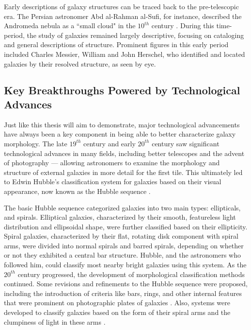 Early descriptions of galaxy structures can be traced back to the pre-telescopic era. The Persian astronomer Abd al-Rahman al-Sufi, for instance, described the Andromeda nebula as a ``small cloud" in the $10^{th}$ century \citep{kepple_98}. During this time-period, the study of galaxies remained largely descriptive, focusing on cataloging and general descriptions of structure. Prominent figures in this early period included Charles Messier, William and John Herschel, who identified and located galaxies by their resolved structure, as seen by eye.

\subsection{Key Breakthroughs Powered by Technological Advances} \label{sec_intro:technology}

Just like this thesis will aim to demonstrate, major technological advancements have always been a key component in being able to better characterize galaxy morphology. The late $19^{th}$ century and early $20^{th}$ century saw significant technological advances in many fields, including better telescopes and the advent of photography ---  allowing astronomers to examine the morphology and structure of external galaxies in more detail for the first tile\citep[e.g.,][]{wolf_08,lundmark_26}. This ultimately led to Edwin Hubble's classification system for galaxies based on their visual appearance, now known as the Hubble sequence \citep{hubble_1926}. 

The basic Hubble sequence categorized galaxies into two main types: ellipticals, and spirals.  Elliptical galaxies, characterized by their smooth, featureless light distribution and ellipsoidal shape, were further classified based on their ellipticity. Spiral galaxies, characterized by their flat, rotating disk component with spiral arms, were divided into normal spirals and barred spirals, depending on whether or not they exhibited a central bar structure. Hubble, and the astronomers who followed him, could classify most nearby bright galaxies using this system. As the $20^{th}$ century progressed, the development of morphological classification methods continued. Some revisions and refinements to the Hubble sequence were proposed, including the introduction of criteria like bars, rings, and other internal features that were prominent on photographic plates of galaxies \citep[e.g.,][]{devac_59}. Also, systems were developed to classify galaxies based on the form of their spiral arms and the clumpiness of light in these arms \citep[e.g.,][]{vbg_60,vbg_76,elmgreen_87}.

